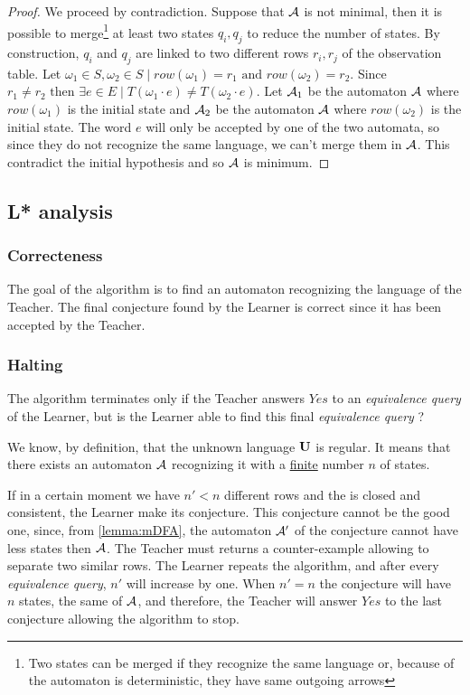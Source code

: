 \begin{proof}
  We proceed by contradiction. Suppose that $\mathcal{A}$ is not minimal, then it is possible to merge\footnote{Two states can be merged if they recognize the same language or, because of the automaton is deterministic, they have same outgoing arrows} at least two states $q_i, q_j$ to reduce the number of states.
  By construction, $q_i$ and $q_j$ are linked to two different rows $r_i, r_j$ of the observation table. Let $\omega_1 \in S, \omega_2 \in S \mid row(\omega_1) = r_1 \text{ and } row(\omega_2) = r_2$. Since $r_1 \neq r_2 \text{ then } \exists e \in E \mid T(\omega_1 \cdot e) \neq T(\omega_2 \cdot e)$. Let $\mathcal{A}_1$ be the automaton $\mathcal{A}$ where $row(\omega_1)$ is the initial state and $\mathcal{A}_2$ be the automaton $\mathcal{A}$ where $row(\omega_2)$ is the initial state. The word $e$ will only be accepted by one of the two automata, so since they do not recognize the same language, we can't merge them in $\mathcal{A}$.
  This contradict the initial hypothesis and so $\mathcal{A}$ is minimum.
\end{proof}

\subsection{L* analysis}
\subsubsection{Correcteness}
The goal of the algorithm is to find an automaton recognizing the language of the Teacher. The final conjecture found by the Learner is correct since it has been accepted by the Teacher.

\subsubsection{Halting}
The algorithm terminates only if the Teacher answers $Yes$ to an \textit{equivalence query} of the Learner, but is the Learner able to find this final \textit{equivalence query} ?

We know, by definition, that the unknown language $\mathbf{U}$ is regular. It means that there exists an automaton $\mathcal{A}$ recognizing it with a \underline{finite} number $n$ of states.

If in a certain moment we have $n' < n$ different rows and the \OT is closed and consistent, the Learner make its conjecture. This conjecture cannot be the good one, since, from \cref{lemma:mDFA}, the automaton $\mathcal{A}'$ of the conjecture cannot have less states then $\mathcal{A}$. The Teacher must returns a counter-example allowing to separate two similar rows. The Learner repeats the algorithm, and after every \textit{equivalence query}, $n'$ will increase by one. When $n' = n$ the conjecture will have $n$ states, the same of $\mathcal{A}$, and therefore, the Teacher will answer $Yes$ to the last conjecture allowing the algorithm to stop.

